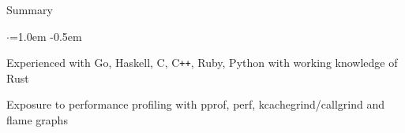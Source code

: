 \documentclass{resume} %
\begin{document}

\begin{rSection}{Summary}
  \vspace {0.5em}
  \begin{list}{$\cdot$}{\leftmargin=1.0em}
    \itemsep -0.5em \vspace{-0.5em}
    \item Experienced with Go, Haskell, C, C\texttt{++}, Ruby, Python with working
      knowledge of Rust
    \item Exposure to performance profiling with pprof, perf,
      kcachegrind/callgrind and flame graphs
  \end{list}
  \vspace{0.5em}
\end{rSection}

\end{document}
